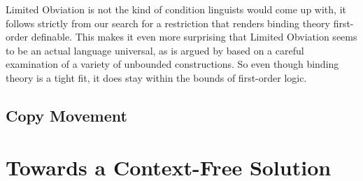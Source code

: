 Limited Obviation is not the kind of condition linguists would come up with, it follows strictly from our search for a restriction that renders binding theory first-order definable.
This makes it even more surprising that Limited Obviation seems to be an actual language universal, as is argued by \citet{GrafAbner12TAG} based on a careful examination of a variety of unbounded constructions.
So even though binding theory is a tight fit, it does stay within the bounds of first-order logic.

\subsection{Copy Movement}

\section{Towards a Context-Free Solution}
